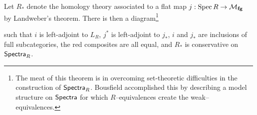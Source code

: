\begin{theorem}[Bousfield]
Let $R_*$ denote the homology theory associated to a flat map $j: \operatorname{Spec} R \to \mathcal{M}_{\mathbf{fg}}$ by Landweber's theorem.  There is then a diagram\footnote{The meat of this theorem is in overcoming set-theoretic difficulties in the construction of $\mathsf{Spectra}_R$.  Bousfield accomplished this by describing a model structure on $\mathsf{Spectra}$ for which $R$--equivalences create the weak--equivalences.}
\begin{center}
\end{center}
such that $i$ is left-adjoint to $L_R$, $j^*$ is left-adjoint to $j_*$, $i$ and $j_*$ are inclusions of full subcategories, the red composites are all equal, and $R_*$ is conservative on $\mathsf{Spectra}_R$.
\end{theorem}

